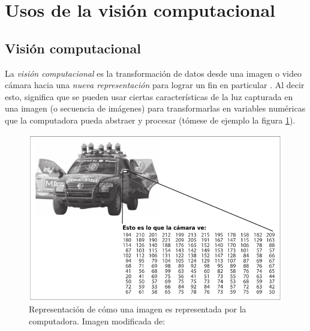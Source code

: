 

	\section{Usos de la visión computacional}
		\subsection*{Visión computacional}
	La \textit{visión computacional} es la transformación de datos desde una imagen o video cámara hacia una \textit{nueva representación} para lograr un fin en particular \cite{bradski2008learning}. Al decir esto, significa que se pueden usar ciertas características de la luz capturada en una imagen (o secuencia de imágenes) para transformarlas en variables numéricas que la computadora pueda abstraer y procesar (tómese de ejemplo la figura \ref{fig:camera_representation}).

\begin{figure}
\centering
\includegraphics[scale=0.6]{images/new_representation_image.png}
\caption{Representación de cómo una imagen es representada por la computadora. Imagen modificada de:}
\label{fig:camera_representation}
\end{figure}

